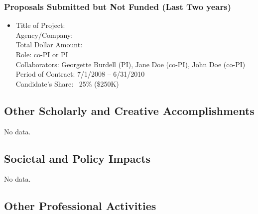 \begin{adjustwidth}{2em}{0pt}
\subsubsection{Proposals Submitted but Not Funded (Last Two years)}

\begin{itemize}
    \item 
    Title of Project: \\ 
    Agency/Company: \\ 
    Total Dollar Amount:  \\ 
    Role: co-PI or PI \\ 
    Collaborators: Georgette Burdell (PI), Jane Doe (co-PI), John Doe (co-PI) \\ 
    Period of Contract: 7/1/2008 – 6/31/2010 \\ 
    Candidate’s Share: ~25\% (\$250K)
\end{itemize}

\end{adjustwidth}

\subsection{Other Scholarly and Creative Accomplishments}


No data.

\subsection{Societal and Policy Impacts}


No data.

\subsection{Other Professional Activities}

